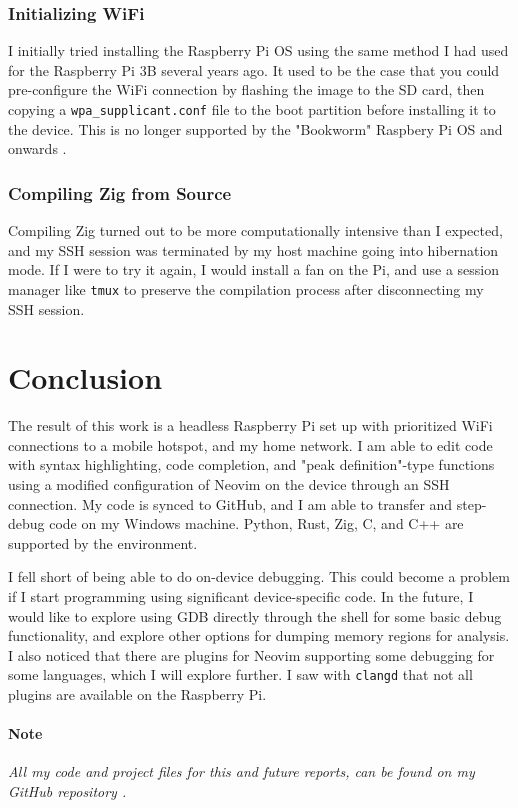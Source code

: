 \documentclass[12pt]{article}
\begin{document}
\subsubsection{Initializing WiFi}
I initially tried installing the Raspberry Pi OS using the same method I had used for the Raspberry Pi 3B several years ago. It used to be the case that you could pre-configure the WiFi connection by flashing the image to the SD card, then copying a \verb|wpa_supplicant.conf| file to the boot partition before installing it to the device. This is no longer supported by the "Bookworm" Raspbery Pi OS and onwards \cite{raspberrypi_config}. 

\subsubsection{Compiling Zig from Source}
Compiling Zig turned out to be more computationally intensive than I expected, and my SSH session was terminated by my host machine going into hibernation mode. If I were to try it again, I would install a fan on the Pi, and use a session manager like \verb|tmux| to preserve the compilation process after disconnecting my SSH session.

\section{Conclusion}\label{sec:conclusion}
The result of this work is a headless Raspberry Pi set up with prioritized WiFi connections to a mobile hotspot, and my home network. I am able to edit code with syntax highlighting, code completion, and "peak definition"-type functions using a modified configuration of Neovim on the device through an SSH connection. My code is synced to GitHub, and I am able to transfer and step-debug code on my Windows machine. Python, Rust, Zig, C, and C++ are supported by the environment.

I fell short of being able to do on-device debugging. This could become a problem if I start programming using significant device-specific code. In the future, I would like to explore using GDB directly through the shell for some basic debug functionality, and explore other options for dumping memory regions for analysis. I also noticed that there are plugins for Neovim supporting some debugging for some languages, which I will explore further. I saw with \verb|clangd| that not all plugins are available on the Raspberry Pi.

\paragraph{Note}
\textit{All my code and project files for this and future reports, can be found on my GitHub repository \cite{lybbert2024classwork}.}



\end{document}
